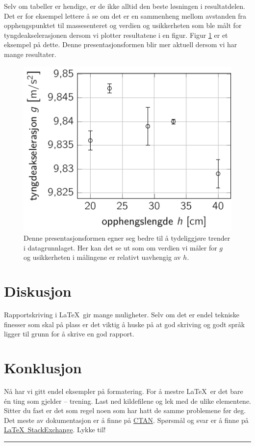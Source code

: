 Selv om tabeller er hendige, er de ikke alltid den beste løsningen i resultatdelen. Det er for eksempel lettere å se om det er en sammenheng mellom avstanden fra opphengspunktet til massesenteret og verdien og usikkerheten som ble målt for tyngdeakselerasjonen dersom vi plotter resultatene i en figur. Figur \ref{fig:resultater} er et eksempel på dette. Denne presentasjonsformen blir mer aktuell dersom vi har mange resultater. 

\begin{figure}[tbp]
\centering
\includegraphics[width=.325\textwidth]{resultater.pdf}
\caption{Denne presentasjonsformen egner seg bedre til å tydeliggjøre trender i datagrunnlaget. Her kan det se ut som om verdien vi måler for $g$ og usikkerheten i målingene er relativt uavhengig av $h$.}
\label{fig:resultater}
\end{figure}


\section{Diskusjon}
Rapportskriving i \LaTeX\ gir mange muligheter. Selv om det er endel tekniske finesser som skal på plass er det viktig å huske på at god skriving og godt språk ligger til grunn for å skrive en god rapport. 

\section{Konklusjon}
Nå har vi gitt endel eksempler på formatering. For å mestre \LaTeX\ er det bare én ting som gjelder -- trening. Last ned kildefilene og lek med de ulike elementene. Sitter du fast er det som regel noen som har hatt de samme problemene før deg. Det meste av dokumentasjon er å finne på \href{http://www.ctan.org/}{CTAN}. Spørsmål og svar er å finne på \href{http://tex.stackexchange.com/}{\LaTeX\ StackExchange}. Lykke til!

\begingroup
\begin{center}
\rule{2cm}{.4pt} %
\end{center}
\makeatletter
{} %
\makeatother


\endgroup


